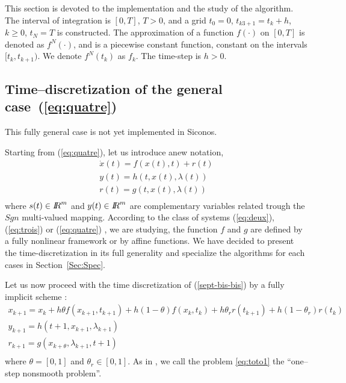  This section is devoted to the implementation and the study  of the algorithm. The interval of integration is $[0,T]$, $T>0$, and a grid $t_{0}=0$, $t_{k3+1}=t_{k}+h$, $k \geq 0$, $t_{N}=T$ is constructed. The approximation of a function $f(\cdot)$ on $[0,T]$ is denoted as $f^{N}(\cdot)$, and is a piecewise constant function, constant on the intervals $[t_{k},t_{k+1})$. We denote $f^{N}(t_{k})$ as $f_{k}$. The time-step is $h>0$. 




\subsection{Time--discretization of the general case~(\ref{eq:quatre}) } 

This fully general case is not yet implemented in Siconos.

Starting from  (\ref{eq:quatre}), let us introduce anew notation, 
\begin{equation}
\begin{array}{l}
\dot{x}(t) = f(x(t),t) + r(t)  \\[2mm]
y(t) = h(t,x(t),\lambda (t)) \\[2mm]
r(t) = g(t,x(t),\lambda (t) ) \\[2mm]
\end{array}
\label{sept-bis-bis}
\end{equation}
where $s(t) \in \mbox{\rm $I\!\!R$}^m$  and $y(t) \in \mbox{\rm $I\!\!R$}^m$ are  complementary variables related trough the $Sgn$ multi-valued mapping.   According to the class of systems (\ref{eq:deux}), (\ref{eq:trois}) or (\ref{eq:quatre}) , we are studying, the function $f$ and $g$ are defined by a fully nonlinear framework or by affine functions. We have decided to present the time-discretization in its full generality and specialize the algorithms for each cases in Section~\ref{Sec:Spec}.


Let us now proceed with the time discretization of (\ref{sept-bis-bis}) by a fully implicit scheme : 
\begin{equation}
  \begin{array}{l}
    \label{eq:toto1}
     x_{k+1} = x_{k} +h\theta f(x_{k+1},t_{k+1})+h(1-\theta) f(x_k,t_k) + h \theta _r r(t_{k+1})
     + h(1-\theta _r)r(t_k)  \\[2mm]
     y_{k+1} =  h(t+1,x_{k+1},\lambda _{k+1}) \\[2mm]
     r_{k+1} = g(x_{k+\theta},\lambda_{k+1},t+1)\\[2mm]
  \end{array}
\end{equation}
where $\theta = [0,1]$ and $\theta _r \in [0,1]$. As in \cite{acary2008}, we call the problem \eqref{eq:toto1} the ``one--step nonsmooth problem''.


